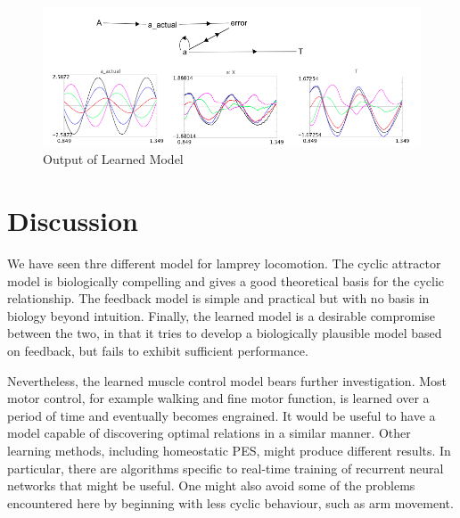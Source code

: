 \documentclass[12pt]{article}
\begin{document}
    \begin{figure}[h!]
      \centering
      \includegraphics[scale=0.5]{learned2.png}
      \caption{Output of Learned Model}
    \end{figure}

\newpage
\section{Discussion}

We have seen thre different model for lamprey locomotion. The cyclic attractor model is biologically compelling and gives a good theoretical basis for the cyclic relationship. The feedback model is simple and practical but with no basis in biology beyond intuition. Finally, the learned model is a desirable compromise between the two, in that it tries to develop a biologically plausible model based on feedback, but fails to exhibit sufficient performance. 

Nevertheless, the learned muscle control model bears further investigation. Most motor control, for example walking and fine motor function, is learned over a period of time and eventually becomes engrained. It would be useful to have a model capable of discovering optimal relations in a similar manner. Other learning methods, including homeostatic PES, might produce different results. In particular, there are algorithms specific to real-time training of recurrent neural networks that might be useful. One might also avoid some of the problems encountered here by beginning with less cyclic behaviour, such as arm movement.
\end{document}
